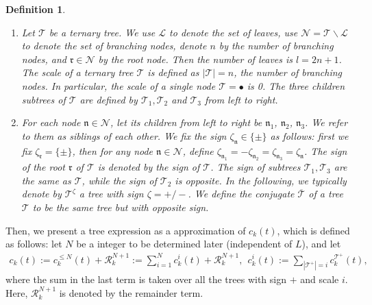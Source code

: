 \documentclass[UTF-8,reqno]{amsart}
\numberwithin{equation}{section}
\newtheorem{definition}[theorem]{Definition}
\theoremstyle{definition}
\def\leq{\leqslant}
\def\leq{\leqslant}
\begin{document}
\begin{definition}\label{tree1} 
\begin{enumerate}
\item Let $\mathcal{T}$ be a ternary tree. We use $\mathcal{L}$ to denote the set of leaves, use $\mathcal{N}=\mathcal{T}\backslash\mathcal{L}$  to denote the set of branching nodes, denote $n$ by the  number of branching nodes, and $\mathfrak{r} \in \mathcal N$ by the root node. Then the number of leaves is $l=2n+1$. The scale of a ternary tree $\mathcal T$ is defined as $|\mathcal T|=n$,   the number of branching nodes. In particular, the scale of a single node $\mathcal{T}=\bullet$ is 0.   The three children subtrees of $\mathcal{T}$ are defined by $\mathcal{T}_1,\mathcal{T}_2$
 and $\mathcal{T}_3$ from left to right.

\item   For each node $\mathfrak{n}\in\mathcal{N}$, let its children from left to right be $\mathfrak{n}_1$, $\mathfrak{n}_2$, $\mathfrak{n}_3$. We refer to them as  siblings of each other. We fix the sign $\zeta_{\mathfrak{n}}\in\{\pm\}$ as follows: first we fix $\zeta_{\mathfrak{r}}=\{\pm\}$, then for any node $\mathfrak{n}\in \mathcal{N}$, define $\zeta_{\mathfrak{n}_1}=-\zeta_{\mathfrak{n}_2}=\zeta_{\mathfrak{n}_3}=\zeta_{\mathfrak{n}}$. The sign of the root $\mathfrak{r}$ of $\mathcal{T}$ is denoted by the sign of $\mathcal{T}$.  The sign of subtrees $\mathcal{T}_1,\mathcal{T}_3$ are the same as $\mathcal{T}$, while the sign of $\mathcal{T}_2$ is opposite.  In the following, we typically denote by $\mathcal{T}^\zeta$ a tree with sign  $\zeta=+/-$. We define the conjugate
 $\overline{\mathcal{T}}$ of a tree $\mathcal{T}$ to be the same tree but with opposite sign.
\end{enumerate}
\end{definition}
 
 Then, we present a tree expression as a  approximation of  $c_k(t)$, which is defined  as follows: let $N$ be a integer to be determined later (independent of $L$), and let
\begin{align}
     c_k(t):=c^{\leq N}_k (t)+\mathcal{R}^{N+1}_k:=\sum_{i=1}^N c^{i}_k (t)+\mathcal{R}^{N+1}_k,\ \  c^{i}_k(t):=\sum_{|\mathcal{T}^+|=i}
 c^{\mathcal{T}^+}_k (t),\label{def:ck}
\end{align}
where the sum in the last term is taken over all the trees with sign $+$ and scale $i$.
 Here, $\mathcal{R}^{N+1}_k$ is denoted by the remainder term. 
\end{document}

